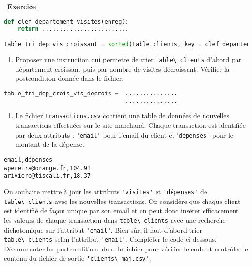 \documentclass[
  11pt,
]{article}
\newcommand{\passthrough}[1]{#1}
\providecommand{\tightlist}{%
  \setlength{\itemsep}{0pt}\setlength{\parskip}{0pt}}
\newcounter{exo}
\newenvironment{exercice}[1]
{\par \medskip   \addtocounter{exo}{1} \noindent  
\begin{bclogo}[arrondi =0.1,   noborder = true, logo=\bccrayon, marge=4]{~\textbf{Exercice} \textbf{\theexo} {\itshape #1} }  \par}
{
\end{bclogo}
 \par \bigskip }
\newcounter{def}
\begin{document}
\begin{exercice}{}
\begin{lstlisting}[language=Python]
def clef_departement_visites(enreg):
    return .........................

table_tri_dep_vis_croissant = sorted(table_clients, key = clef_departement_visites)
\end{lstlisting}

\begin{enumerate}
\def\labelenumi{\arabic{enumi}.}
\setcounter{enumi}{3}
\tightlist
\item
  Proposer une instruction qui permette de trier
  \passthrough{\lstinline!table\_clients!} d'abord par département
  croissant puis par nombre de visites décroissant. Vérifier la
  postcondition donnée dans le fichier.
\end{enumerate}

\begin{lstlisting}[language=Python]
table_tri_dep_crois_vis_decrois =  ...............
                                   ...............
\end{lstlisting}

\begin{enumerate}
\def\labelenumi{\arabic{enumi}.}
\setcounter{enumi}{4}
\tightlist
\item
  Le fichier \passthrough{\lstinline!transactions.csv!} contient une
  table de données de nouvelles transactions effectuées sur le site
  marchand. Chaque transaction est identifiée par deux attributs :
  \passthrough{\lstinline!'email'!} pour l'email du client et
  '\passthrough{\lstinline!dépenses'!} pour le montant de la dépense.
\end{enumerate}

\begin{lstlisting}
email,dépenses
wpereira@orange.fr,104.91
ariviere@tiscali.fr,18.37
\end{lstlisting}

On souhaite mettre à jour les attributs
\passthrough{\lstinline!'visites'!} et
\passthrough{\lstinline!'dépenses'!} de
\passthrough{\lstinline!table\_clients!} avec les nouvelles
transactions. On considère que chaque client est identifié de façon
unique par son email et on peut donc insérer efficacement les valeurs de
chaque transaction dans \passthrough{\lstinline!table\_clients!} avec
une recherche dichotomique sur l'attribut
\passthrough{\lstinline!'email'!}. Bien sûr, il faut d'abord trier
\passthrough{\lstinline!table\_clients!} selon l'attribut
\passthrough{\lstinline!'email'!}. Compléter le code ci-dessous.
Décommenter les postconditions dans le fichier pour vérifier le code et
contrôler le contenu du fichier de sortie
\passthrough{\lstinline!'clients\_maj.csv'!}.


\end{exercice}
\end{document}
